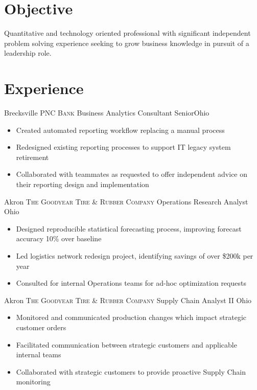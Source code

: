\documentclass[letterpaper,12pt,color,final]{moderncv}
\begin{document}
\makecvtitle

\section{Objective}

Quantitative and technology oriented professional with significant independent problem solving experience seeking to grow business knowledge in pursuit of a leadership role.

\section{Experience}

{Brecksville}
{\textsc{PNC Bank}}
{Business Analytics Consultant Senior}{Ohio}
{\begin{itemize}
  \item Created automated reporting workflow replacing a manual process
  \item Redesigned existing reporting processes to support IT legacy system retirement
  \item Collaborated with teammates as requested to offer independent advice on their reporting design and implementation
 \end{itemize}}

{Akron}
{\textsc{The Goodyear Tire \& Rubber Company}}
{Operations Research Analyst}
{Ohio}
{\begin{itemize}
  \item Designed reproducible statistical forecasting process, improving forecast accuracy 10\% over baseline
  \item Led logistics network redesign project, identifying savings of over \$200k per year
  \item Consulted for internal Operations teams for ad-hoc optimization requests
 \end{itemize}}

{Akron}
{\textsc{The Goodyear Tire \& Rubber Company}}
{Supply Chain Analyst II}
{Ohio}
{\begin{itemize}
  \item Monitored and communicated production changes which impact strategic customer orders
  \item Facilitated communication between strategic customers and applicable internal teams
  \item Collaborated with strategic customers to provide proactive Supply Chain monitoring
 \end{itemize}}
\end{document}
